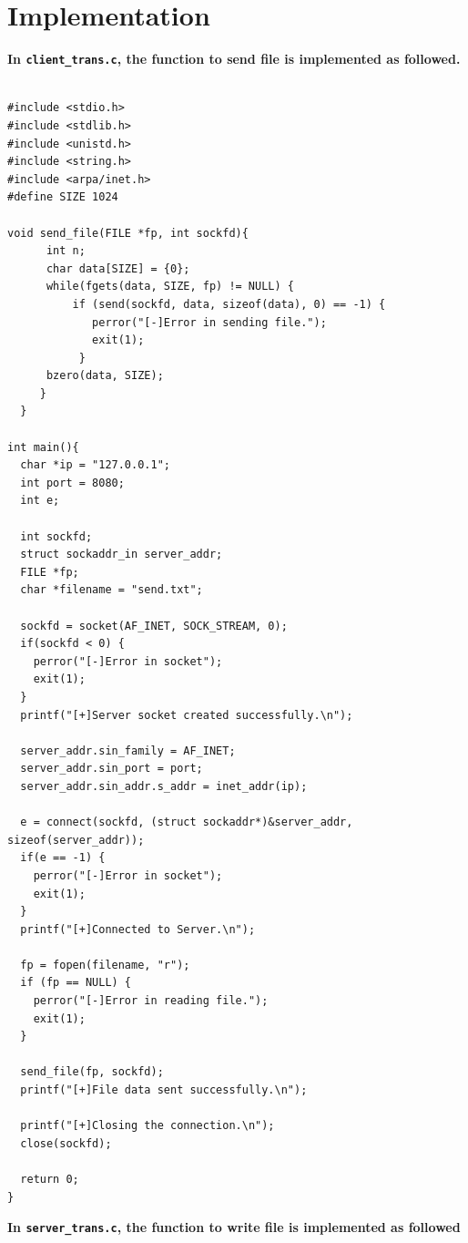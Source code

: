 \documentclass[12pt]{article}
\begin{document}
\section{Implementation}
\hspace{0.5cm}
\textbf{ In \texttt{client_trans.c}, the function to send file is implemented as followed.}
\hspace{1cm}
\begin{verbatim}

#include <stdio.h>
#include <stdlib.h>
#include <unistd.h>
#include <string.h>
#include <arpa/inet.h>
#define SIZE 1024

void send_file(FILE *fp, int sockfd){
      int n;
      char data[SIZE] = {0};
      while(fgets(data, SIZE, fp) != NULL) {
          if (send(sockfd, data, sizeof(data), 0) == -1) {
             perror("[-]Error in sending file.");
             exit(1);
           }
      bzero(data, SIZE);
     }
  }
 
int main(){
  char *ip = "127.0.0.1";
  int port = 8080;
  int e;
 
  int sockfd;
  struct sockaddr_in server_addr;
  FILE *fp;
  char *filename = "send.txt";
 
  sockfd = socket(AF_INET, SOCK_STREAM, 0);
  if(sockfd < 0) {
    perror("[-]Error in socket");
    exit(1);
  }
  printf("[+]Server socket created successfully.\n");
 
  server_addr.sin_family = AF_INET;
  server_addr.sin_port = port;
  server_addr.sin_addr.s_addr = inet_addr(ip);
 
  e = connect(sockfd, (struct sockaddr*)&server_addr, sizeof(server_addr));
  if(e == -1) {
    perror("[-]Error in socket");
    exit(1);
  }
  printf("[+]Connected to Server.\n");
 
  fp = fopen(filename, "r");
  if (fp == NULL) {
    perror("[-]Error in reading file.");
    exit(1);
  }
 
  send_file(fp, sockfd);
  printf("[+]File data sent successfully.\n");
 
  printf("[+]Closing the connection.\n");
  close(sockfd);
 
  return 0;
}                        
\end{verbatim}
\vspace{0.5cm}
\hspace{0.5cm}
 \textbf{In \texttt{server_trans.c}, the function to write file is implemented as followed}
 \hspace{1cm}
\end{document}
